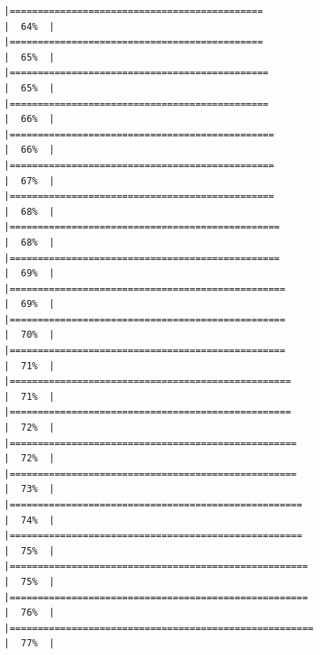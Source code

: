 \documentclass[
  english,
  man,a4paper,mask,floatsintext]{apa6}
\begin{document}
\begin{verbatim}
|=============================================                         |  64%  |                                                                              |=============================================                         |  65%  |                                                                              |==============================================                        |  65%  |                                                                              |==============================================                        |  66%  |                                                                              |===============================================                       |  66%  |                                                                              |===============================================                       |  67%  |                                                                              |===============================================                       |  68%  |                                                                              |================================================                      |  68%  |                                                                              |================================================                      |  69%  |                                                                              |=================================================                     |  69%  |                                                                              |=================================================                     |  70%  |                                                                              |=================================================                     |  71%  |                                                                              |==================================================                    |  71%  |                                                                              |==================================================                    |  72%  |                                                                              |===================================================                   |  72%  |                                                                              |===================================================                   |  73%  |                                                                              |====================================================                  |  74%  |                                                                              |====================================================                  |  75%  |                                                                              |=====================================================                 |  75%  |                                                                              |=====================================================                 |  76%  |                                                                              |======================================================                |  77%  |                                                                              
\end{verbatim}
\end{document}
